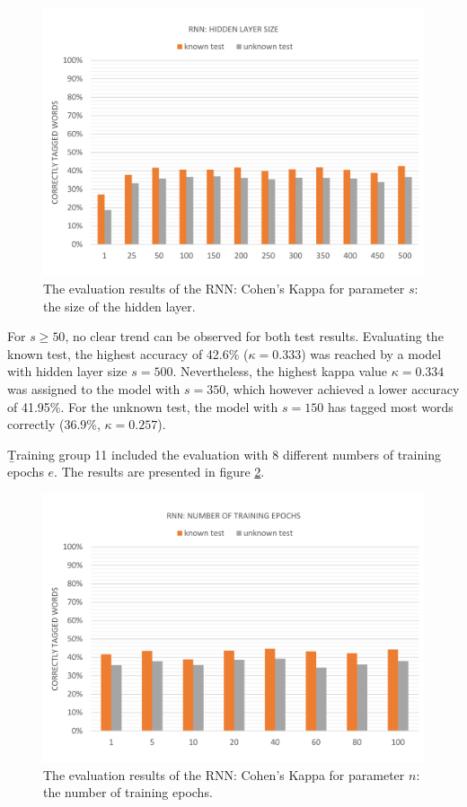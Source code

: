 \begin{figure}[H]
	\hspace{-5mm}\includegraphics[width=1.07\textwidth]{images/evaluation_rnn_s}
	\caption[RNN Evaluation: Hidden Layer Size]{The evaluation results of the RNN: Cohen's Kappa for parameter $s$: the size of the hidden layer.}
	\label{f.evaluation.rnn.s}
\end{figure}

For $s\geq50$, no clear trend can be observed for both test results. Evaluating the known test, the highest accuracy of 42.6\% ($\kappa=0.333$) was reached by a model with hidden layer size $s=500$. Nevertheless, the highest kappa value $\kappa=0.334$ was assigned to the model with $s=350$, which however achieved a lower accuracy of 41.95\%. For the unknown test, the model with $s=150$ has tagged most words correctly (36.9\%, $\kappa=0.257$).

\b{Training group 11} included the evaluation with 8 different numbers of training epochs $e$. The results are presented in figure \ref{f.evaluation.rnn.n}.

\begin{figure}[H]
	\hspace{-5mm}\includegraphics[width=1.07\textwidth]{images/evaluation_rnn_n}
	\caption[RNN Evaluation: Number of Training Epochs]{The evaluation results of the RNN: Cohen's Kappa for parameter $n$: the number of training epochs.}
	\label{f.evaluation.rnn.n}
\end{figure}

